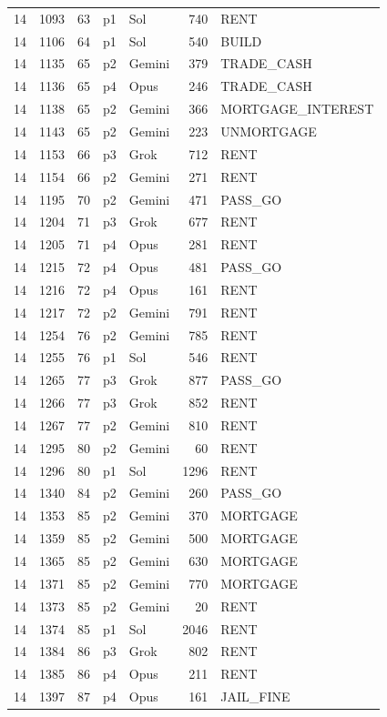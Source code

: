 \begin{longtable}{r r r l l r >{\ttfamily}l}
14 & 1093 & 63 & p1 & Sol & 740 & RENT \\
14 & 1106 & 64 & p1 & Sol & 540 & BUILD \\
14 & 1135 & 65 & p2 & Gemini & 379 & TRADE\_CASH \\
14 & 1136 & 65 & p4 & Opus & 246 & TRADE\_CASH \\
14 & 1138 & 65 & p2 & Gemini & 366 & MORTGAGE\_INTEREST \\
14 & 1143 & 65 & p2 & Gemini & 223 & UNMORTGAGE \\
14 & 1153 & 66 & p3 & Grok & 712 & RENT \\
14 & 1154 & 66 & p2 & Gemini & 271 & RENT \\
14 & 1195 & 70 & p2 & Gemini & 471 & PASS\_GO \\
14 & 1204 & 71 & p3 & Grok & 677 & RENT \\
14 & 1205 & 71 & p4 & Opus & 281 & RENT \\
14 & 1215 & 72 & p4 & Opus & 481 & PASS\_GO \\
14 & 1216 & 72 & p4 & Opus & 161 & RENT \\
14 & 1217 & 72 & p2 & Gemini & 791 & RENT \\
14 & 1254 & 76 & p2 & Gemini & 785 & RENT \\
14 & 1255 & 76 & p1 & Sol & 546 & RENT \\
14 & 1265 & 77 & p3 & Grok & 877 & PASS\_GO \\
14 & 1266 & 77 & p3 & Grok & 852 & RENT \\
14 & 1267 & 77 & p2 & Gemini & 810 & RENT \\
14 & 1295 & 80 & p2 & Gemini & 60 & RENT \\
14 & 1296 & 80 & p1 & Sol & 1296 & RENT \\
14 & 1340 & 84 & p2 & Gemini & 260 & PASS\_GO \\
14 & 1353 & 85 & p2 & Gemini & 370 & MORTGAGE \\
14 & 1359 & 85 & p2 & Gemini & 500 & MORTGAGE \\
14 & 1365 & 85 & p2 & Gemini & 630 & MORTGAGE \\
14 & 1371 & 85 & p2 & Gemini & 770 & MORTGAGE \\
14 & 1373 & 85 & p2 & Gemini & 20 & RENT \\
14 & 1374 & 85 & p1 & Sol & 2046 & RENT \\
14 & 1384 & 86 & p3 & Grok & 802 & RENT \\
14 & 1385 & 86 & p4 & Opus & 211 & RENT \\
14 & 1397 & 87 & p4 & Opus & 161 & JAIL\_FINE \\

\end{longtable}
